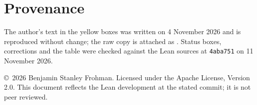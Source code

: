 \documentclass[11pt]{article}
\newcommand{\pinshort}{4aba751}
\begin{document}
\section*{Provenance}
The author's text in the yellow boxes was written on 4 November 2026 and is reproduced without
change; the raw copy is attached as . Status boxes, corrections and the
table were checked against the Lean sources at \texttt{\pinshort} on 11 November 2026.

\vspace{1em}
\noindent\small\copyright\ 2026 Benjamin Stanley Frohman. Licensed under the Apache License,
Version 2.0. This document reflects the Lean development at the stated commit; it is not peer reviewed.
\end{document}
